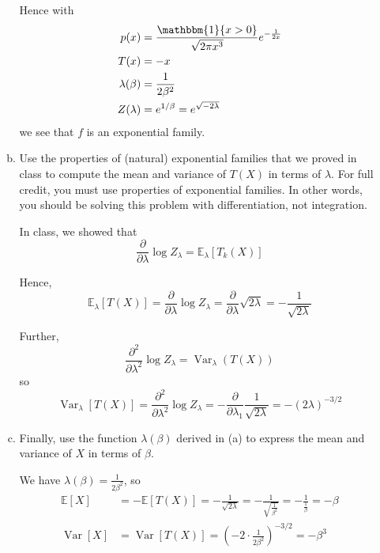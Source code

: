\documentclass[11pt]{report}
\DeclareMathOperator{\Var}{\text{Var}}
\newcommand{\ind}{{\mathbbm{1}}}
\newcommand{\E}{\mathbb{E}}
\begin{document}
\begin{enumerate}[1.]
\begin{enumerate}[(a)]
                    Hence with
                    \begin{align*}
                        p(x)           & = \frac{\ind\{x> 0\}}{\sqrt{2\pi x^3}}e^{-\frac{1}{2x}} \\
                        T(x)           & = -x                                                    \\
                        \lambda(\beta) & = \frac{1}{2\beta^2}                                    \\
                        Z(\lambda)     & = e^{1/\beta} = e^{\sqrt{-2\lambda}}
                    \end{align*}
                    we see that $f$ is an exponential family.
                    \color{black}

              \item Use the properties of (natural) exponential families that we proved in class to compute the mean and variance of $T(X)$ in terms of $\lambda$. For full credit, you must use properties of exponential families. In other words, you should be solving this problem with differentiation, not integration.

                    \color{blue}
                    In class, we showed that
                    \[\frac{\partial}{\partial \lambda} \log Z_{\lambda} = \E_{\lambda}[T_k(X)]\]

                    Hence,
                    \[\E_{\lambda}[T(X)] = \frac{\partial }{\partial \lambda} \log Z_{\lambda} = \frac{\partial}{\partial \lambda} \sqrt{2\lambda} = -\frac{1}{\sqrt{2\lambda}}\]

                    Further,
                    \[\frac{\partial^2}{\partial \lambda^2} \log Z_{\lambda}= \Var_{\lambda}(T(X))\]
                    so
                    \[\Var_{\lambda}[T(X)] = \frac{\partial^2}{\partial \lambda^2} \log Z_{\lambda}= -\frac{\partial}{\partial \lambda_1} \frac{1}{\sqrt{2\lambda}} = -(2\lambda)^{-3/2}\]
                    \color{black}

              \item Finally, use the function $\lambda(\beta)$ derived in (a) to express the mean and variance of $X$ in terms of $\beta$.

                    \color{blue}
                    We have $\lambda(\beta) = \frac{1}{2\beta^2}$, so
                    \begin{align*}
                        \E[X]   & = -\E[T(X)] = -\frac{1}{\sqrt{2\lambda}} = -\frac{1}{\sqrt{\frac{1}{\beta^2}}} = -\frac{1}{\frac{1}{\beta}} = \boxed{-\beta} \\
                        \Var[X] & = \Var[T(X)] = \left(-2\cdot \frac{1}{2\beta^2}\right)^{-3/2} = \boxed{-\beta^3}
                    \end{align*}
                    \color{black}


\end{enumerate}
\end{enumerate}
\end{document}
